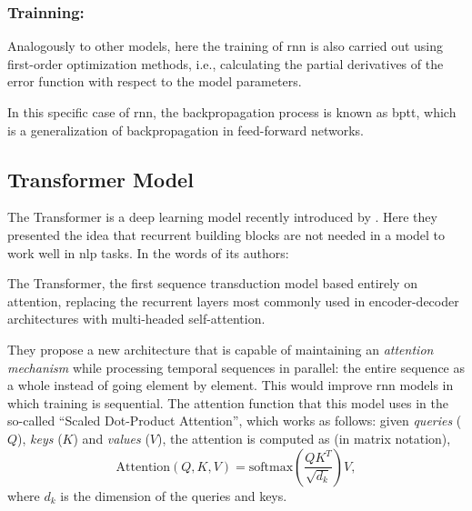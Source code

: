 \subsubsection{Trainning: }%

Analogously to other models, here the training of \gls{rnn} is also carried out
using first-order optimization methods, i.e., calculating the partial
derivatives of the error function with respect to the model parameters.

In this specific case of \gls{rnn}, the backpropagation process is known as
\gls{bptt}, which is a generalization of backpropagation in feed-forward
networks.


\subsection{Transformer Model}%
\label{sec:transformers}

The Transformer is a deep learning model recently introduced by
. Here they presented the idea that
recurrent building blocks are not needed in a model to work well in \gls{nlp}
tasks. In the words of its authors:

\begin{quoteBox}
  The Transformer, the first sequence transduction model based entirely
  on attention, replacing the recurrent layers most commonly used in
  encoder-decoder architectures with multi-headed self-attention.
  \tcblower{}
\end{quoteBox}

They propose a new architecture that is capable of maintaining an
\emph{attention mechanism} while processing
temporal sequences in parallel: the entire sequence as a whole instead of going
element by element.  This would improve \gls{rnn} models in which training is
sequential. The attention function that this model uses in the so-called
``Scaled Dot-Product Attention'', which works as follows: given \emph{queries}
(\(Q\)), \emph{keys} (\(K\)) and \emph{values} (\(V\)), the attention is
computed as (in matrix notation),
\begin{equation}\label{eq:attention}
  \text{Attention}(Q, K, V) =
  \text{softmax}\left(\frac{QK^T}{\sqrt{d_k}}\right)V,
\end{equation}
where \(d_k\) is the dimension of the queries and keys.

